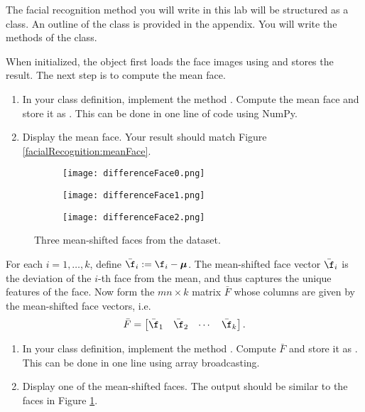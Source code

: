 \begin{problem}
\label{prob:meanFace}
\leavevmode

The facial recognition method you will write in this lab will be structured as a class.
An outline of the  class is provided in the appendix. %
You will write the methods of the class.

When initialized, the  object first loads the face images using  and stores the result.
The next step is to compute the mean face.
\begin{enumerate}
\item In your class definition, implement the method .
Compute the mean face and store it as .
This can be done in one line of code using NumPy.

\item Display the mean face.
Your result should match Figure \ref{facialRecognition:meanFace}.
\end{enumerate}
\end{problem}

\begin{figure}
\begin{subfigure}[b]{0.3\textwidth}
\texttt{[image: differenceFace0.png]}
\end{subfigure}
\begin{subfigure}[b]{0.3\textwidth}
\texttt{[image: differenceFace1.png]}
\end{subfigure}
\begin{subfigure}[b]{0.3\textwidth}
\texttt{[image: differenceFace2.png]}
\end{subfigure}
\caption{Three mean-shifted faces from the dataset.}
\label{facialRecognition:differenceFaces}
\end{figure}
For each $i = 1,\ldots, k$, define $\bar{\f}_i := \f_i - {\boldsymbol \mu}$.
The mean-shifted face vector $\bar{\f}_i$ is the deviation of the $i$-th face from the mean, and thus captures the unique features of the face.
Now form the $mn \times k$ matrix $\bar{F}$ whose columns are given by the mean-shifted face vectors, i.e.
\[
\bar{F} = \begin{bmatrix}
\bar{\f}_1 & \bar{\f}_2 & \cdots & \bar{\f}_k
\end{bmatrix}.
\]
\begin{problem}
\leavevmode
\begin{enumerate}
\item In your class definition, implement the method .
Compute $\bar{F}$ and store it as .
This can be done in one line using array broadcasting.
\item
Display one of the mean-shifted faces.
The output should be similar to the faces in Figure \ref{facialRecognition:differenceFaces}.
\end{enumerate}
\end{problem}


